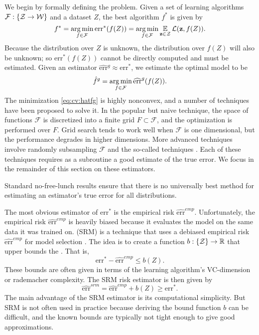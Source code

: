 \documentclass[thesis.tex]{subfiles}
\newcommand{\set}[1]{\mathcal {#1}}
\newcommand{\riskstar}{{\textrm{err}^*}}
\newcommand{\riskhat}{\widehat{\textrm{err}}}
\newcommand{\riskemp}{\widehat{\textrm{err}}^\textit{emp}}
\newcommand{\risksrm}{\widehat{\textrm{err}}^\textit{srm}}
\begin{document}
We begin by formally defining the  problem.
Given a set of learning algorithms $\set F : \{\Z \to \W\}$ and a dataset $Z$,
the best algorithm $f^*$ is given by
\begin{equation}
    f^*
    = \argmin_{f\in\set F} \riskstar(f(Z))
    = \argmin_{f\in\set F} \E_{\z\in\Z}\Loss(\z,f(Z))
    .
\end{equation}
Because the distribution over $Z$ is unknown, 
the distribution over $f(Z)$ will also be unknown;
so $\riskstar(f(Z))$ cannot be directly computed and must be estimated.
Given an estimator $\riskhat{}^g \approx \riskstar$,
we estimate the optimal model to be
\begin{equation}
    \label{eq:cv:hatfg}
    \hat f^g = \argmin_{f\in\set F} \riskhat^g(f(Z))
    .
\end{equation}
The minimization \eqref{eq:cv:hatfg} is highly nonconvex,
and a number of techniques have been proposed to solve it.
In the popular but naive  technique,
the space of functions $\set F$ is discretized into a finite grid $F\subset\set F$,
and the optimization is performed over $F$.
Grid search tends to work well when $\set F$ is one dimensional,
but the performance degrades in higher dimensions.
More advanced techniques involve randomly subsampling $\set F$ \citep{bergstra2012random} and the so-called  techniques \citep[e.g.][]{snoek2012practical,feurer2015efficient}.
Each of these techniques requires as a subroutine a good estimate of the true error.
We focus in the remainder of this section on these estimators.

Standard no-free-lunch results \citep[e.g.\ Chapter 8 of][]{shalev2014understanding} ensure that there is no universally best method for estimating an estimator's true error for all distributions.

The most obvious estimator of $\riskstar$ is the empirical risk $\riskemp$.
Unfortunately, the empirical risk $\riskemp$ is heavily biased because it evaluates the model on the same data it was trained on.
 (SRM) is a technique that uses a debiased empirical risk $\riskemp$ for model selection
\citep[Chapter 7 of ][]{shalev2014understanding}.
The idea is to create a function $b : \{{\mathcal Z}\} \to \mathbb R$ that upper bounds the .
That is,
\begin{equation}
    \riskstar-    \riskemp\le b(Z)
    .
\end{equation}
These bounds are often given in terms of the learning algorithm's VC-dimension or rademacher complexity.
The SRM risk estimator is then given by
\begin{equation}
    \risksrm 
    = \riskemp + b(Z) 
    \ge \riskstar
    .
\end{equation}
The main advantage of the SRM estimator is its computational simplicity.
But SRM is not often used in practice because deriving the bound function $b$ can be difficult,
and the known bounds are typically not tight enough to give good approximations.
\end{document}
